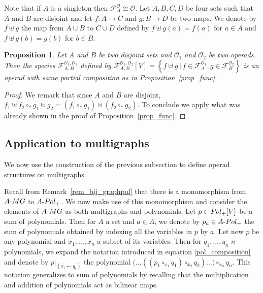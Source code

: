 \documentclass[11pt]{article}
\newtheorem{prop}[theo]{Proposition}
\theoremstyle{definition}
\numberwithin{equation}{section}
\newcommand{\take}{\leftarrow}
\newcommand{\set}[1]{\left\{#1\right\}}
\newcommand{\spe}[1]{\normalfont{\textsc{#1}}}
\newcommand{\comp}[1][\ast]{\circ_{#1}}
\newcommand{\MG}{\spe{MG}}
\newcommand{\Poly}{\spe{Pol}_+}
\newcommand{\augm}[2]{#1\text{-}#2}
\newcommand{\func}[2]{\mathcal{F}_{#1}^{#2}}
\newcommand{\Operad}{\mathcal{O}}
\begin{document}
Note that if $A$ is a singleton then $\func{A}{\Operad} \cong \Operad$. Let $A,B,C,D$ be four sets such 
that $A$ and $B$ are disjoint and let $f:A\to C$ and $g:B\to D$ be two maps. We denote by $f\uplus g$ the map 
from $A\cup B$ to $C\cup D$ defined by $f\uplus g(a) = f(a)$ for $a\in A$ and $f\uplus g(b) = g(b)$ for 
$b\in B$. 

\begin{prop}
    Let $A$ and $B$ be two disjoint sets and $\Operad_1$ and $\Operad_2$ be two operads. Then the species 
    $\func{A,B}{\Operad_1,\Operad_2}$ defined by 
    $\func{A,B}{\Operad_1,\Operad_2}[V] = \set{f\uplus g\,|\, f\in\func{A}{\Operad_1}, g\in\func{B}{\Operad_2}}$ 
    is an operad with same partial composition as in Proposition~\ref{prop_func}.
\end{prop}

\begin{proof}
    We remark that since $A$ and $B$ are disjoint, 
    $f_1\uplus f_2\comp g_1\uplus g_2 = (f_1\comp g_1)\uplus (f_2\comp g_2)$. To conclude we apply what 
    was already shown in the proof of Proposition~\ref{prop_func}.
\end{proof}




\subsection{Application to multigraphs}\label{subsec_graph_op}

We now use the construction of the previous subsection to define operad structures on multigraphs. 

Recall from Remark~\ref{rem_bij_graphpol} that there is a monomorphism from $\augm{A}{\MG}$ to 
$\augm{A}{\Poly}$. We now make use of this monomorphism and consider the elements of $\augm{A}{\MG}$ as 
both multigraphs and polynomials. Let $p\in\Poly[V]$ be a sum of polynomials. Then for $A$ a set and $a\in A$, 
we denote by $p_a\in\augm{A}{\Poly}$ the sum of polynomials obtained by indexing all the variables in $p$ 
by $a$. Let now $p$ be any polynomial and $x_1,\dots, x_n$ a subset of its variables. Then for 
$q_1,\dots, q_n$ $n$ polynomials, we expand the notation introduced in equation \eqref{pol_composition} 
and denote by $p|_{\set{x_i\take q_i}}$ the polynomial 
$\big(\dots((p_1\comp[x_1] q_1)\comp[x_2] q_2)\dots\big)\comp[x_n] q_n$. This notation generalizes to sum 
of polynomials by recalling that the multiplication and addition of polynomials act as bilinear maps.
\end{document}
